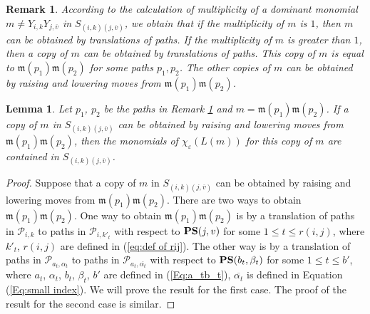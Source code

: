 \documentclass[12pt, reqno]{amsart}
\newtheorem{lemma}[theorem]{Lemma}
\newtheorem{remark}[theorem]{Remark}
\numberwithin{equation}{section}
\begin{document}
{\begin{remark}\label{R:multiplicity}
According to the calculation of multiplicity of a dominant monomial $m\neq Y_{i,k}Y_{j, \overline{v}}$ in $S_{(i, k)(j, \overline{v})}$, we obtain that if the multiplicity of $m$ is $1$, then $m$ can be obtained by translations of paths. If the multiplicity of $m$ is greater than $1$, then a copy of $m$ can be obtained by translations of paths. This copy of $m$ is equal to $\mathfrak{m}(p_1)\mathfrak{m}(p_2)$ for some paths $p_1, p_2$. The other copies of $m$ can be obtained by raising and lowering moves from $\mathfrak{m}(p_1)\mathfrak{m}(p_2)$.
\end{remark}

\begin{lemma}\label{Le:dominant is obtained by lowering and raising moves}
Let $p_1$, $p_2$ be the paths in Remark \ref{R:multiplicity} and $m=\mathfrak{m}(p_1)\mathfrak{m}(p_2)$. If a copy of $m$ in $S_{(i, k)(j, \overline{v})}$ can be obtained by raising and lowering moves from $\mathfrak{m}(p_1)\mathfrak{m}(p_2)$, then the monomials of
$\chi_{\varepsilon}(L(m))$ for this copy of $m$ are contained in $S_{(i, k)(j, \overline{v})}$.
\end{lemma}

\begin{proof}
Suppose that a copy of $m$ in $S_{(i, k)(j, \overline{v})}$ can be obtained by raising and lowering moves from $\mathfrak{m}(p_1)\mathfrak{m}(p_2)$.
There are two ways to obtain $\mathfrak{m}(p_1)\mathfrak{m}(p_2)$. One way to obtain $\mathfrak{m}(p_1)\mathfrak{m}(p_2)$ is by a translation of paths in $\mathscr{P}_{i,k}$ to paths in $\mathscr{P}_{i,k'_t}$ with respect to ${\bf PS}(j,v)$ for some $1\leq t \leq r(i,j)$, where $k'_t$, $r(i,j)$ are defined in (\ref{eq:def of rij}). The other way is by a translation of paths in $\mathscr{P}_{a_t,\alpha_t}$ to paths in $\mathscr{P}_{a_t,\overline{\alpha_t}}$ with respect to ${\bf PS}(b_t,\beta_t)$ for some $1\leq t \leq b'$, where $a_t$, $\alpha_t$, $b_t$, $\beta_t$, $b'$ are defined in (\ref{Eq:a_tb_t}), $\overline{\alpha_t}$ is defined in Equation (\ref{Eq:small index}). We will prove the result for the first case. The proof of the result for the second case is similar.


\end{proof}}
\end{document}
